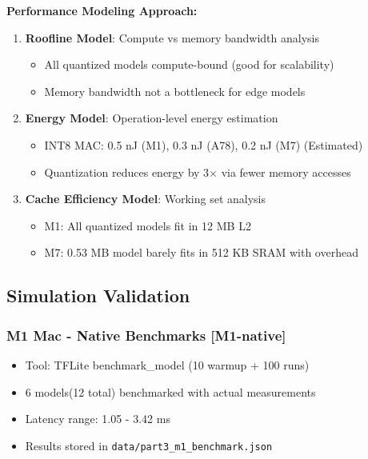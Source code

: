 \documentclass[10pt, a4paper]{article}
\begin{document}
\textbf{Performance Modeling Approach:}

\begin{enumerate}
    \item \textbf{Roofline Model}: Compute vs memory bandwidth analysis
    \begin{itemize}
        \item All quantized models compute-bound (good for scalability)
        \item Memory bandwidth not a bottleneck for edge models
    \end{itemize}
    
    \item \textbf{Energy Model}: Operation-level energy estimation
    \begin{itemize}
        \item INT8 MAC: 0.5 nJ (M1), 0.3 nJ (A78), 0.2 nJ (M7) (Estimated)
        \item Quantization reduces energy by 3× via fewer memory accesses
    \end{itemize}
    
    \item \textbf{Cache Efficiency Model}: Working set analysis
    \begin{itemize}
        \item M1: All quantized models fit in 12 MB L2 
        \item M7: 0.53 MB model barely fits in 512 KB SRAM with overhead
    \end{itemize}
\end{enumerate}

\subsection{Simulation Validation}

\subsubsection{M1 Mac - Native Benchmarks [M1-native]}
\begin{itemize}
    \item Tool: TFLite benchmark\_model (10 warmup + 100 runs)
    \item 6 models(12 total) benchmarked with actual measurements
    \item Latency range: 1.05 - 3.42 ms
    \item Results stored in \texttt{data/part3\_m1\_benchmark.json}
\end{itemize}
\end{document}
